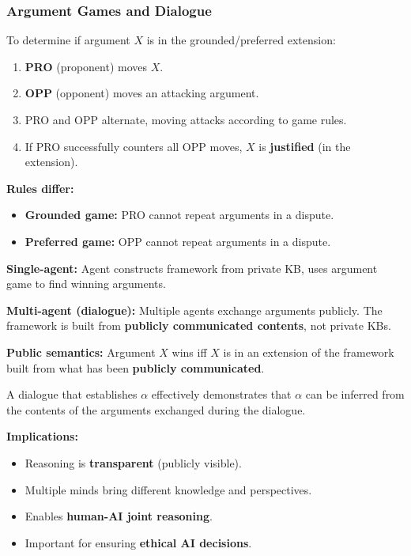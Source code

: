 \bigseparator

\subsubsection{Argument Games and Dialogue}

\begin{defbox}
To determine if argument $X$ is in the grounded/preferred extension:
\begin{enumerate}
  \item \textbf{PRO} (proponent) moves $X$.
  \item \textbf{OPP} (opponent) moves an attacking argument.
  \item PRO and OPP alternate, moving attacks according to game rules.
  \item If PRO successfully counters all OPP moves, $X$ is \textbf{justified} (in the extension).
\end{enumerate}

\textbf{Rules differ:}
\begin{itemize}
  \item \textbf{Grounded game:} PRO cannot repeat arguments in a dispute.
  \item \textbf{Preferred game:} OPP cannot repeat arguments in a dispute.
\end{itemize}
\end{defbox}

\separator

\begin{defbox}
\textbf{Single-agent:} Agent constructs framework from private KB, uses argument game to find winning arguments.

\textbf{Multi-agent (dialogue):} Multiple agents exchange arguments publicly. The framework is built from \textbf{publicly communicated contents}, not private KBs.

\textbf{Public semantics:} Argument $X$ wins iff $X$ is in an extension of the framework built from what has been \textbf{publicly communicated}.
\end{defbox}

\begin{thmbox}
A dialogue that establishes $\alpha$ effectively demonstrates that $\alpha$ can be inferred from the contents of the arguments exchanged during the dialogue.

\textbf{Implications:}
\begin{itemize}
  \item Reasoning is \textbf{transparent} (publicly visible).
  \item Multiple minds bring different knowledge and perspectives.
  \item Enables \textbf{human-AI joint reasoning}.
  \item Important for ensuring \textbf{ethical AI decisions}.
\end{itemize}
\end{thmbox}

